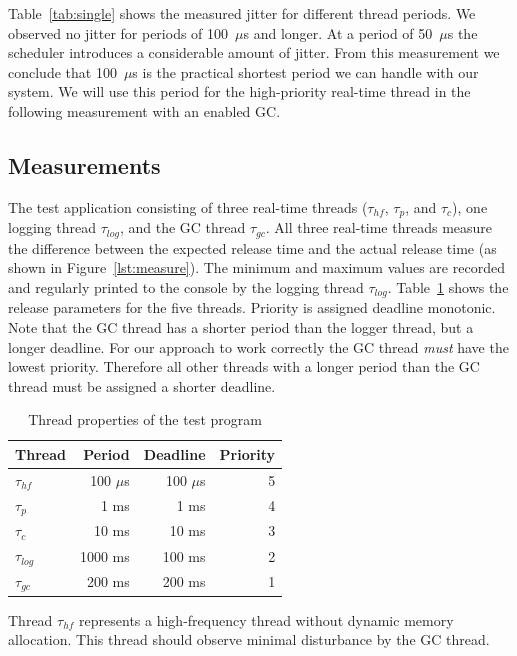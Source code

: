 Table~\ref{tab:single} shows the measured jitter for different
thread periods. We observed no jitter for periods of 100~$\mu$s and
longer. At a period of 50~$\mu$s the scheduler introduces a
considerable amount of jitter. From this measurement we conclude
that 100~$\mu$s is the practical shortest period we can handle with
our system. We will use this period for the high-priority real-time
thread in the following measurement with an enabled GC.

\subsection{Measurements}


The test application consisting of three real-time threads
($\tau_{hf}$, $\tau_{p}$, and $\tau_{c}$), one logging thread
$\tau_{log}$, and the GC thread $\tau_{gc}$. All three real-time
threads measure the difference between the expected release time and
the actual release time (as shown in Figure~\ref{lst:measure}). The
minimum and maximum values are recorded and regularly printed to the
console by the logging thread $\tau_{log}$. Table~\ref{tab:exp}
shows the release parameters for the five threads. Priority is
assigned deadline monotonic. Note that the GC thread has a shorter
period than the logger thread, but a longer deadline. For our
approach to work correctly the GC thread \emph{must} have the lowest
priority. Therefore all other threads with a longer period than the
GC thread must be assigned a shorter deadline.

\begin{table}
    \centering
    \begin{tabular}{lrrr}
    \toprule
    Thread & Period & Deadline & Priority \\
    \midrule
    $\tau_{hf}$ & 100 $\mu$s & 100 $\mu$s & 5 \\
    $\tau_{p}$ &  1 ms & 1 ms & 4 \\
    $\tau_{c}$ & 10 ms & 10 ms & 3 \\
    $\tau_{log}$ & 1000 ms & 100 ms & 2 \\
    $\tau_{gc}$ & 200 ms & 200 ms & 1 \\
    \bottomrule
    \end{tabular}
    \caption{Thread properties of the test program}
    \label{tab:exp}
\end{table}

Thread $\tau_{hf}$ represents a high-frequency thread without
dynamic memory allocation. This thread should observe minimal
disturbance by the GC thread.

